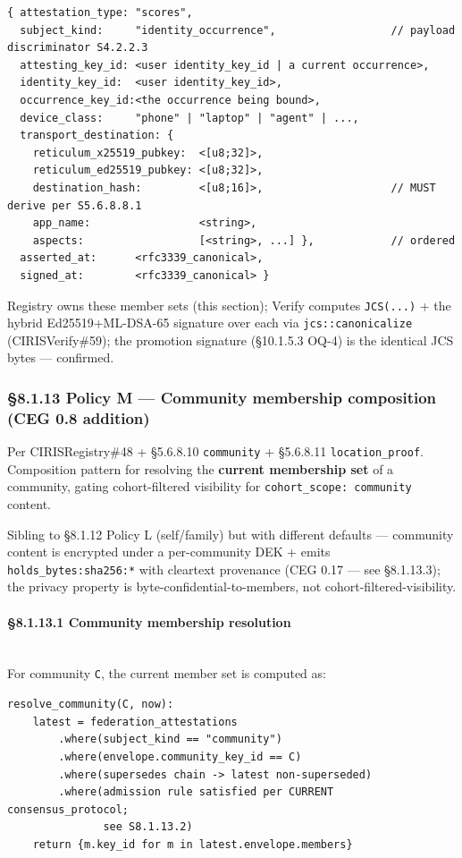 \documentclass[11pt]{article}
\begin{document}
\begin{lstlisting}
{ attestation_type: "scores",
  subject_kind:     "identity_occurrence",                  // payload discriminator S4.2.2.3
  attesting_key_id: <user identity_key_id | a current occurrence>,
  identity_key_id:  <user identity_key_id>,
  occurrence_key_id:<the occurrence being bound>,
  device_class:     "phone" | "laptop" | "agent" | ...,
  transport_destination: {
    reticulum_x25519_pubkey:  <[u8;32]>,
    reticulum_ed25519_pubkey: <[u8;32]>,
    destination_hash:         <[u8;16]>,                    // MUST derive per S5.6.8.8.1
    app_name:                 <string>,
    aspects:                  [<string>, ...] },            // ordered
  asserted_at:      <rfc3339_canonical>,
  signed_at:        <rfc3339_canonical> }
\end{lstlisting}

Registry owns these member sets (this section); Verify computes \texttt{JCS(...)} + the hybrid Ed25519+ML-DSA-65 signature over each via \texttt{jcs::canonicalize} (CIRISVerify\#59); the promotion signature (§10.1.5.3 OQ-4) is the identical JCS bytes — confirmed.


\subsubsection*{§8.1.13 Policy M — Community membership composition (CEG 0.8 addition)}


Per CIRISRegistry\#48 + §5.6.8.10 \texttt{community} + §5.6.8.11 \texttt{location\_proof}. Composition pattern for resolving the \textbf{current membership set} of a community, gating cohort-filtered visibility for \texttt{cohort\_scope: community} content.


Sibling to §8.1.12 Policy L (self/family) but with different defaults — community content is encrypted under a per-community DEK + emits \texttt{holds\_bytes:sha256:*} with cleartext provenance (CEG 0.17 — see §8.1.13.3); the privacy property is byte-confidential-to-members, not cohort-filtered-visibility.


\paragraph{§8.1.13.1 Community membership resolution}\mbox{}\\


For community \texttt{C}, the current member set is computed as:


\begin{lstlisting}
resolve_community(C, now):
    latest = federation_attestations
        .where(subject_kind == "community")
        .where(envelope.community_key_id == C)
        .where(supersedes chain -> latest non-superseded)
        .where(admission rule satisfied per CURRENT consensus_protocol;
               see S8.1.13.2)
    return {m.key_id for m in latest.envelope.members}
\end{lstlisting}
\end{document}

